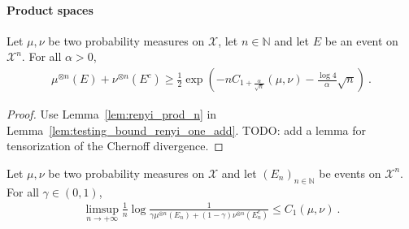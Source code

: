 \paragraph{Product spaces}

\begin{lemma}
  \label{lem:testing_bound_renyi_one_add_n}
  Let $\mu, \nu$ be two probability measures on $\mathcal X$, let $n \in \mathbb{N}$ and let $E$ be an event on $\mathcal X^n$. For all $\alpha > 0$,
  \begin{align*}
  \mu^{\otimes n}(E) + \nu^{\otimes n}(E^c) \ge \frac{1}{2}\exp\left( - n C_{1+\frac{\alpha}{\sqrt{n}}}(\mu, \nu) - \frac{\log 4}{\alpha}\sqrt{n}\right) \: .
  \end{align*}
\end{lemma}

\begin{proof}
Use Lemma~\ref{lem:renyi_prod_n} in Lemma~\ref{lem:testing_bound_renyi_one_add}. TODO: add a lemma for tensorization of the Chernoff divergence.
\end{proof}

\begin{theorem}
  \label{thm:testing_bound_chernoff}
  Let $\mu, \nu$ be two probability measures on $\mathcal X$ and let $(E_n)_{n \in \mathbb{N}}$ be events on $\mathcal X^n$. For all $\gamma \in (0,1)$,
  \begin{align*}
  \limsup_{n \to +\infty} \frac{1}{n}\log \frac{1}{\gamma \mu^{\otimes n}(E_n) + (1 - \gamma)\nu^{\otimes n}(E_n^c)}
  \le C_1(\mu, \nu)
  \: .
  \end{align*}
\end{theorem}

